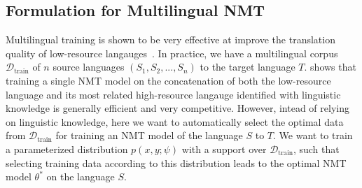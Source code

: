 \subsection{\label{sec:nmt_method}Formulation for Multilingual NMT}

Multilingual training is shown to be very effective at improve the translation quality of low-resource langauges~\citep{nmt_transfer,rapid_adapt_nmt,johnson_nmt}. In practice, we have a multilingual corpus $\mathcal{D}_{\text{train}}$ of $n$ source languages $(S_1, S_2, ..., S_n)$ to the target language $T$. \cite{rapid_adapt_nmt} shows that training a single NMT model on the concatenation of both the low-resource language and its most related high-resource langauge identified with linguistic knowledge is generally efficient and very competitive. However, intead of relying on linguistic knowledge, here we want to automatically select the optimal data from $\mathcal{D}_{\text{train}}$ for training an NMT model of the language $S$ to $T$. We want to train a parameterized distribution $p(x, y;\psi)$ with a support over $\mathcal{D}_{\text{train}}$, such that selecting training data according to this distribution leads to the optimal NMT model $\theta^*$ on the language $S$. 
